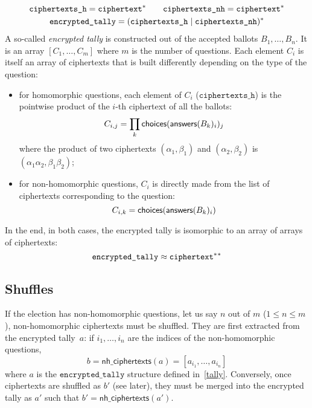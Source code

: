 \documentclass[a4paper]{article}
\newcommand{\etally}{\texttt{encrypted\_tally}}
\begin{document}
\begin{gather*}
  \texttt{ciphertexts\_h}=\ciphertext^\ast
  \qquad
  \texttt{ciphertexts\_nh}=\ciphertext^\ast
  \\
  \etally=(\texttt{ciphertexts\_h}\mid\texttt{ciphertexts\_nh})^\ast
\end{gather*}
A so-called \emph{encrypted tally} is constructed out of the accepted
ballots $B_1,\dots,B_n$.  It is an array $[C_1,\dots,C_m]$ where $m$
is the number of questions. Each element $C_i$ is itself an array of
ciphertexts that is built differently depending on the type of the
question:
\begin{itemize}
\item for homomorphic questions, each element of $C_i$
  ($\texttt{ciphertexts\_h}$) is the pointwise product of the $i$-th
  ciphertext of all the ballots:
  \[
    C_{i,j}=\prod_{k}\textsf{choices}(\textsf{answers}(B_k)_i)_j
  \]
  where the product of two ciphertexts $(\alpha_1,\beta_1)$ and
  $(\alpha_2,\beta_2)$ is $(\alpha_1\alpha_2,\beta_1\beta_2)$;
\item for non-homomorphic questions, $C_i$ is directly made from the
  list of ciphertexts corresponding to the question:
  \[
    C_{i,k}=\textsf{choices}(\textsf{answers}(B_k)_i)
  \]
\end{itemize}
In the end, in both cases, the encrypted tally is isomorphic to an
array of arrays of ciphertexts:
\[
\etally\approx\ciphertext^\ast{}^\ast
\]

\subsection{Shuffles}
\label{shuffles}

If the election has non-homomorphic questions, let us say $n$ out of
$m$ ($1\leq n\leq m$), non-homomorphic ciphertexts must be
shuffled. They are first extracted from the encrypted tally~$a$: if
$i_1,\dots,i_n$ are the indices of the non-homomorphic questions,
\[
  b=\textsf{nh\_ciphertexts}(a)=[a_{i_1},\dots,a_{i_n}]
\]
where $a$ is the $\etally$ structure defined
in~\ref{tally}. Conversely, once ciphertexts are shuffled as $b'$ (see
later), they must be merged into the encrypted tally as $a'$ such that
$b'=\textsf{nh\_ciphertexts}(a')$.
\end{document}

